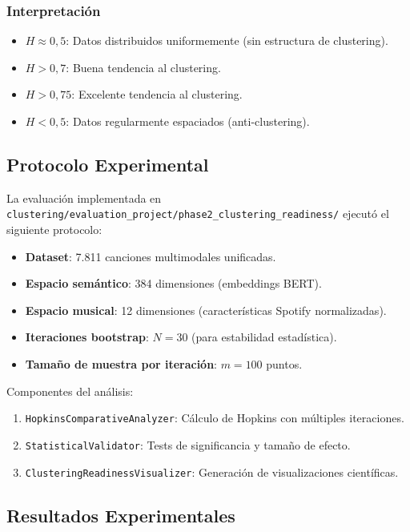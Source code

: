 \subsubsection{Interpretación}
\begin{itemize}
    \item $H \approx 0{,}5$: Datos distribuidos uniformemente (sin estructura de clustering).
    \item $H > 0{,}7$: Buena tendencia al clustering.
    \item $H > 0{,}75$: Excelente tendencia al clustering.
    \item $H < 0{,}5$: Datos regularmente espaciados (anti-clustering).
\end{itemize}

\subsection{Protocolo Experimental}
\label{subsec:protocolo-hopkins}

La evaluación implementada en \texttt{clustering/evaluation\_project/phase2\_clustering\_readiness/} ejecutó el siguiente protocolo:

\begin{itemize}
    \item \textbf{Dataset}: 7.811 canciones multimodales unificadas.
    \item \textbf{Espacio semántico}: 384 dimensiones (embeddings BERT).
    \item \textbf{Espacio musical}: 12 dimensiones (características Spotify normalizadas).
    \item \textbf{Iteraciones bootstrap}: $N = 30$ (para estabilidad estadística).
    \item \textbf{Tamaño de muestra por iteración}: $m = 100$ puntos.
\end{itemize}

Componentes del análisis:
\begin{enumerate}
    \item \texttt{HopkinsComparativeAnalyzer}: Cálculo de Hopkins con múltiples iteraciones.
    \item \texttt{StatisticalValidator}: Tests de significancia y tamaño de efecto.
    \item \texttt{ClusteringReadinessVisualizer}: Generación de visualizaciones científicas.
\end{enumerate}

\subsection{Resultados Experimentales}
\label{subsec:resultados-hopkins}

